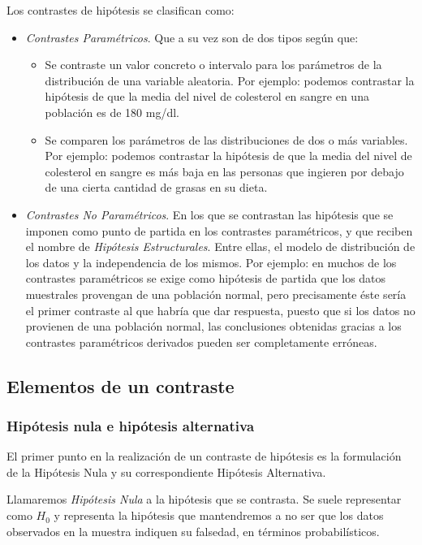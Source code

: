 Los contrastes de hipótesis se clasifican como:
\begin{itemize}
    \item \emph{Contrastes Paramétricos}.
    Que a su vez son de dos tipos según que:
    \begin{itemize}
        \item Se contraste un valor concreto o intervalo para los
        parámetros de la distribución de una variable aleatoria.
        Por ejemplo: podemos contrastar la hipótesis de que la
        media del nivel de colesterol en sangre en una población
        es de 180 mg/dl.
        \item Se comparen los parámetros de las distribuciones de
        dos o más variables. Por ejemplo: podemos contrastar la
        hipótesis de que la media del nivel de colesterol en
        sangre es más baja en las personas que ingieren por debajo
        de una cierta cantidad de grasas en su dieta.
    \end{itemize}
    \item \emph{Contrastes No Paramétricos}.
    En los que se contrastan las hipótesis que se imponen como
    punto de partida en los contrastes paramétricos, y que reciben
    el nombre de \emph{Hipótesis Estructurales}. Entre ellas, el modelo
    de distribución de los datos y la independencia de los mismos.
    Por ejemplo: en muchos de los contrastes paramétricos se exige
    como hipótesis de partida que los datos muestrales provengan
    de una población normal, pero precisamente éste sería el
    primer contraste al que habría que dar respuesta, puesto que
    si los datos no provienen de una población normal, las
    conclusiones obtenidas gracias a los contrastes paramétricos
    derivados pueden ser completamente erróneas.
\end{itemize}

\subsection{Elementos de un contraste}

\subsubsection{Hipótesis nula e hipótesis alternativa}

El primer punto en la realización de un contraste de hipótesis es
la formulación de la Hipótesis Nula y su correspondiente Hipótesis
Alternativa.

Llamaremos \emph{Hipótesis Nula} a la hipótesis que se contrasta.
Se suele representar como $H_0$ y representa la hipótesis que
mantendremos a no ser que los datos observados en la muestra
indiquen su falsedad, en términos probabilísticos.

